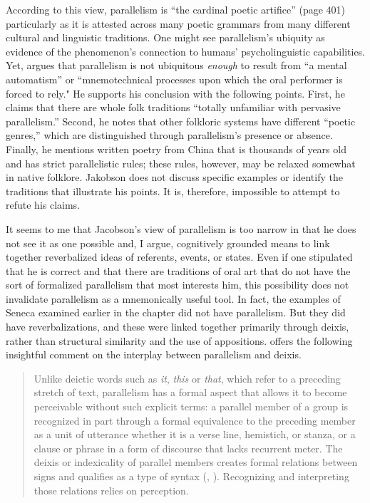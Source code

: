 \noindent According to this view, parallelism is “the cardinal poetic artifice” (page 401) particularly as it is attested across many poetic grammars from many different cultural and linguistic traditions. One might see parallelism’s ubiquity as evidence of the phenomenon’s connection to humans’ psycholinguistic capabilities. Yet, \citet[423]{Jakobson1966} argues that parallelism is not ubiquitous \textit{enough} to result from “a mental automatism” or “mnemotechnical processes upon which the oral performer is forced to rely." He supports his conclusion with the following points. First, he claims that there are whole folk traditions “totally unfamiliar with pervasive parallelism.” Second, he notes that other folkloric systems have different “poetic genres,” which are distinguished through parallelism’s presence or absence. Finally, he mentions written poetry from China that is thousands of years old and has strict parallelistic rules; these rules, however, may be relaxed somewhat in native folklore. Jakobson does not discuss specific examples or identify the traditions that illustrate his points. It is, therefore, impossible to attempt to refute his claims.

It seems to me that Jacobson’s view of parallelism is too narrow in that he does not see it as one possible and, I argue, cognitively grounded means to link together reverbalized ideas of referents, events, or states. Even if one stipulated that he is correct and that there are traditions of oral art that do not have the sort of formalized parallelism that most interests him, this possibility does not invalidate parallelism as a mnemonically useful tool. In fact, the examples of Seneca examined earlier in the chapter did not have parallelism. But they did have reverbalizations, and these were linked together primarily through deixis, rather than structural similarity and the use of appositions. \citet[206]{FrogTarkka2017} offers the following insightful comment on the interplay between parallelism and deixis.

\begin{quote}
Unlike deictic words such as \textit{it}, \textit{this} or \textit{that}, which refer to a preceding stretch of text, parallelism has a formal aspect that allows it to become perceivable without such explicit terms: a parallel member of a group is recognized in part through a formal equivalence to the preceding member as a unit of utterance whether it is a verse line, hemistich, or stanza, or a clause or phrase in a form of discourse that lacks recurrent meter. The deixis or indexicality of parallel members creates formal relations between signs and qualifies as a type of syntax (\citealt[22]{Morris1971}, \citealt[387--400]{DuBois2014}). Recognizing and interpreting those relations relies on perception.
\end{quote}

